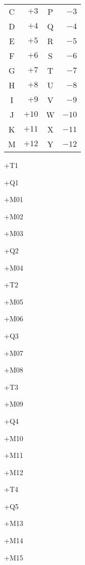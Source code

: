 \documentclass[10pt]{book}
\begin{document}
\begin{center}
\begin{tabular}{cr|cr}
        C & $ +3$ & P &  $-3$ \\
        D & $ +4$ & Q &  $-4$ \\
        E & $ +5$ & R &  $-5$ \\
        F & $ +6$ & S &  $-6$ \\
        G & $ +7$ & T &  $-7$ \\
        H & $ +8$ & U &  $-8$ \\
        I & $ +9$ & V &  $-9$ \\
        J & $+10$ & W & $-10$ \\
        K & $+11$ & X & $-11$ \\
        M & $+12$ & Y & $-12$ \\
        \bottomrule
    \end{tabular}
    \hspace*{\fill}
    \vspace*{\fill}
\end{center}

+T1

+Q1

+M01

+M02

+M03

+Q2

+M04

+T2

+M05

+M06

+Q3

+M07

+M08

+T3

+M09

+Q4

+M10

+M11

+M12

+T4

+Q5

+M13

+M14

+M15
\end{document}
